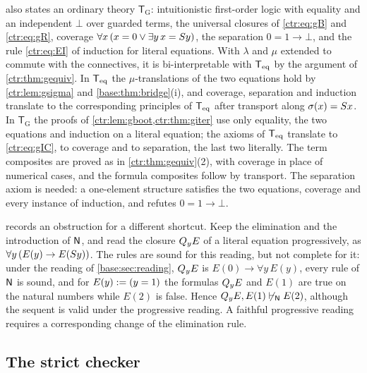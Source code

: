 \begin{remark}\label{ctr:rem:gordinary}
 also states an ordinary theory $\mathsf T_{\mathrm G}$: intuitionistic
first-order logic with equality and an independent $\bot$ over guarded terms, the universal
closures of \eqref{ctr:eq:gB} and \eqref{ctr:eq:gR}, coverage
$\forall x\,(x=0\lor\exists y\,x=S y)$, the separation $0=1\to\bot$, and the rule
\eqref{ctr:eq:EI} of induction for literal equations. With $\lambda$ and $\mu$ extended to
commute with the connectives, it is bi-interpretable with $\mathsf{T}_{\mathrm{eq}}$ by the argument of
\cref{ctr:thm:gequiv}. In $\mathsf{T}_{\mathrm{eq}}$ the $\mu$-translations of the two equations hold by
\cref{ctr:lem:gsigma} and \cref{base:thm:bridge}(i), and coverage, separation and
induction translate to the corresponding principles of $\mathsf{T}_{\mathrm{eq}}$ after transport along
$\sigma(x)=S x$. In $\mathsf T_{\mathrm G}$ the proofs of
\cref{ctr:lem:gboot,ctr:thm:giter} use only equality, the two equations and induction on a
literal equation; the axioms of $\mathsf{T}_{\mathrm{eq}}$ translate to \eqref{ctr:eq:gIC}, to coverage and to
separation, the last two literally. The term composites are proved as in
\cref{ctr:thm:gequiv}(2), with coverage in place of numerical cases, and the formula
composites follow by transport. The separation axiom is needed: a one-element structure
satisfies the two equations, coverage and every instance of induction, and refutes
$0=1\to\bot$.
\end{remark}

\begin{remark}\label{ctr:rem:gclosure}
 records an obstruction for a different shortcut. Keep the
elimination  and the introduction  of $\mathsf{N}$, and read the closure
$Q_{y}E$ of a literal equation progressively, as $\forall y\,(E(y)\to E(S y))$. The rules
are sound for this reading, but not complete for it: under the reading of
\cref{base:sec:reading}, $Q_{y}E$ is $E(0)\to\forall y\,E(y)$, every rule of $\mathsf{N}$ is
sound, and for $E(y)\mathrel{:=}(y=1)$ the formulas $Q_{y}E$ and $E(1)$ are true on the natural
numbers while $E(2)$ is false. Hence $Q_{y}E,E(1)\not\vdash_{\mathsf{N}}E(2)$, although the
sequent is valid under the progressive reading. A faithful progressive reading requires a
corresponding change of the elimination rule.
\end{remark}

\subsection{The strict checker}


